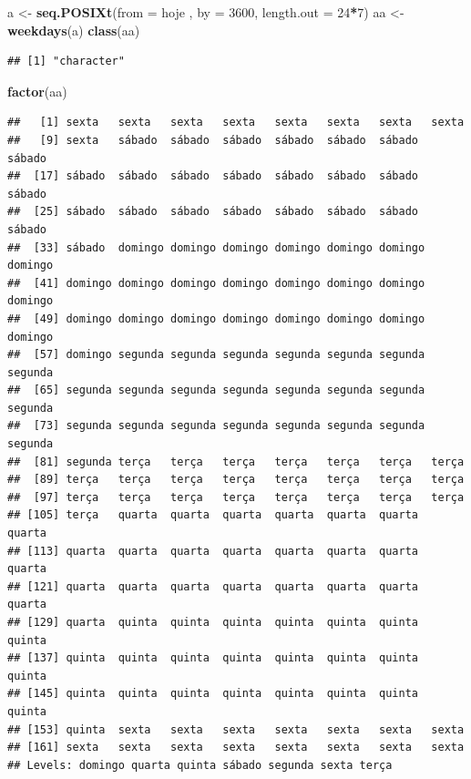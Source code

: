 \documentclass[]{book}
\newenvironment{Shaded}{\begin{snugshade}}{\end{snugshade}}
\newcommand{\KeywordTok}[1]{\textcolor[rgb]{0.13,0.29,0.53}{\textbf{#1}}}
\newcommand{\DataTypeTok}[1]{\textcolor[rgb]{0.13,0.29,0.53}{#1}}
\newcommand{\DecValTok}[1]{\textcolor[rgb]{0.00,0.00,0.81}{#1}}
\newcommand{\StringTok}[1]{\textcolor[rgb]{0.31,0.60,0.02}{#1}}
\newcommand{\OperatorTok}[1]{\textcolor[rgb]{0.81,0.36,0.00}{\textbf{#1}}}
\newcommand{\NormalTok}[1]{#1}
\theoremstyle{definition}
\theoremstyle{definition}
\theoremstyle{definition}
\theoremstyle{remark}
\begin{document}
\begin{Shaded}
\begin{Highlighting}[]
\NormalTok{a <-}\StringTok{ }\KeywordTok{seq.POSIXt}\NormalTok{(}\DataTypeTok{from =}\NormalTok{ hoje , }\DataTypeTok{by =} \DecValTok{3600}\NormalTok{, }\DataTypeTok{length.out =} \DecValTok{24}\OperatorTok{*}\DecValTok{7}\NormalTok{)}
\NormalTok{aa <-}\StringTok{ }\KeywordTok{weekdays}\NormalTok{(a)}
\KeywordTok{class}\NormalTok{(aa)}
\end{Highlighting}
\end{Shaded}

\begin{verbatim}
## [1] "character"
\end{verbatim}

\begin{Shaded}
\begin{Highlighting}[]
\KeywordTok{factor}\NormalTok{(aa)}
\end{Highlighting}
\end{Shaded}

\begin{verbatim}
##   [1] sexta   sexta   sexta   sexta   sexta   sexta   sexta   sexta  
##   [9] sexta   sábado  sábado  sábado  sábado  sábado  sábado  sábado 
##  [17] sábado  sábado  sábado  sábado  sábado  sábado  sábado  sábado 
##  [25] sábado  sábado  sábado  sábado  sábado  sábado  sábado  sábado 
##  [33] sábado  domingo domingo domingo domingo domingo domingo domingo
##  [41] domingo domingo domingo domingo domingo domingo domingo domingo
##  [49] domingo domingo domingo domingo domingo domingo domingo domingo
##  [57] domingo segunda segunda segunda segunda segunda segunda segunda
##  [65] segunda segunda segunda segunda segunda segunda segunda segunda
##  [73] segunda segunda segunda segunda segunda segunda segunda segunda
##  [81] segunda terça   terça   terça   terça   terça   terça   terça  
##  [89] terça   terça   terça   terça   terça   terça   terça   terça  
##  [97] terça   terça   terça   terça   terça   terça   terça   terça  
## [105] terça   quarta  quarta  quarta  quarta  quarta  quarta  quarta 
## [113] quarta  quarta  quarta  quarta  quarta  quarta  quarta  quarta 
## [121] quarta  quarta  quarta  quarta  quarta  quarta  quarta  quarta 
## [129] quarta  quinta  quinta  quinta  quinta  quinta  quinta  quinta 
## [137] quinta  quinta  quinta  quinta  quinta  quinta  quinta  quinta 
## [145] quinta  quinta  quinta  quinta  quinta  quinta  quinta  quinta 
## [153] quinta  sexta   sexta   sexta   sexta   sexta   sexta   sexta  
## [161] sexta   sexta   sexta   sexta   sexta   sexta   sexta   sexta  
## Levels: domingo quarta quinta sábado segunda sexta terça
\end{verbatim}
\end{document}
